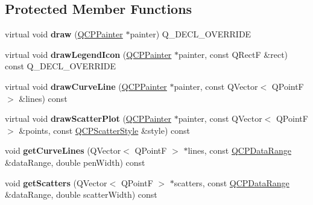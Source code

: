 \subsection*{Protected Member Functions}
\begin{DoxyCompactItemize}
\item 
\mbox{\label{class_q_c_p_curve_ac199d41d23865cd68bd7b598308a4433}} 
virtual void {\bfseries draw} (\mbox{\hyperlink{class_q_c_p_painter}{Q\+C\+P\+Painter}} $\ast$painter) Q\+\_\+\+D\+E\+C\+L\+\_\+\+O\+V\+E\+R\+R\+I\+DE
\item 
\mbox{\label{class_q_c_p_curve_aac6e94afbce4002d2cd7793250154e84}} 
virtual void {\bfseries draw\+Legend\+Icon} (\mbox{\hyperlink{class_q_c_p_painter}{Q\+C\+P\+Painter}} $\ast$painter, const Q\+RectF \&rect) const Q\+\_\+\+D\+E\+C\+L\+\_\+\+O\+V\+E\+R\+R\+I\+DE
\item 
\mbox{\label{class_q_c_p_curve_aa4d7415f7c69eb7820263941f7d88e2c}} 
virtual void {\bfseries draw\+Curve\+Line} (\mbox{\hyperlink{class_q_c_p_painter}{Q\+C\+P\+Painter}} $\ast$painter, const Q\+Vector$<$ Q\+PointF $>$ \&lines) const
\item 
\mbox{\label{class_q_c_p_curve_a0bea811373c5ee8c67c9c2b4d74ad866}} 
virtual void {\bfseries draw\+Scatter\+Plot} (\mbox{\hyperlink{class_q_c_p_painter}{Q\+C\+P\+Painter}} $\ast$painter, const Q\+Vector$<$ Q\+PointF $>$ \&points, const \mbox{\hyperlink{class_q_c_p_scatter_style}{Q\+C\+P\+Scatter\+Style}} \&style) const
\item 
\mbox{\label{class_q_c_p_curve_aefca1e5127fae2d7ff65b9e921637c58}} 
void {\bfseries get\+Curve\+Lines} (Q\+Vector$<$ Q\+PointF $>$ $\ast$lines, const \mbox{\hyperlink{class_q_c_p_data_range}{Q\+C\+P\+Data\+Range}} \&data\+Range, double pen\+Width) const
\item 
\mbox{\label{class_q_c_p_curve_a564c5fdc8409e3532b1322389a8434b8}} 
void {\bfseries get\+Scatters} (Q\+Vector$<$ Q\+PointF $>$ $\ast$scatters, const \mbox{\hyperlink{class_q_c_p_data_range}{Q\+C\+P\+Data\+Range}} \&data\+Range, double scatter\+Width) const
\item 
\mbox{\label{class_q_c_p_curve_a77c89253397c4754b40d4bc8d3e789bf}} 

\end{DoxyCompactItemize}
